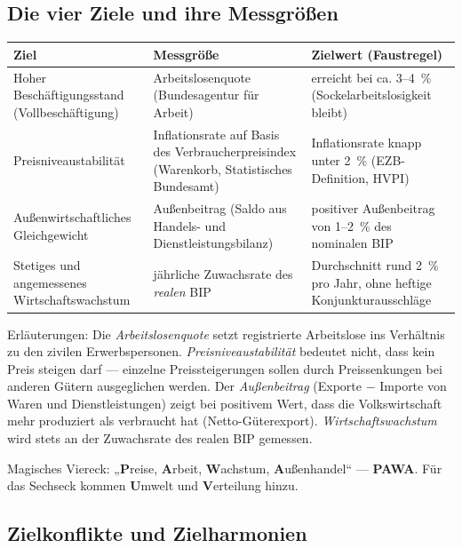 \documentclass[11pt, a4paper]{article}
\begin{document}
\subsection{Die vier Ziele und ihre Messgrößen}

\begin{center}
\begin{tabular}{p{4.2cm} p{4.6cm} p{5.4cm}}
\toprule
\textbf{Ziel} & \textbf{Messgröße} & \textbf{Zielwert (Faustregel)}\\
\midrule
Hoher Beschäftigungsstand (Vollbeschäftigung) & Arbeitslosenquote (Bundesagentur für Arbeit) & erreicht bei ca. 3--4~\% (Sockelarbeitslosigkeit bleibt)\\
Preisniveaustabilität & Inflationsrate auf Basis des Verbraucherpreisindex (Warenkorb, Statistisches Bundesamt) & Inflationsrate knapp unter 2~\% (EZB-Definition, HVPI)\\
Außenwirtschaftliches Gleichgewicht & Außenbeitrag (Saldo aus Handels- und Dienstleistungsbilanz) & positiver Außenbeitrag von 1--2~\% des nominalen BIP\\
Stetiges und angemessenes Wirtschaftswachstum & jährliche Zuwachsrate des \emph{realen} BIP & Durchschnitt rund 2~\% pro Jahr, ohne heftige Konjunkturausschläge\\
\bottomrule
\end{tabular}
\end{center}

Erläuterungen: Die \emph{Arbeitslosenquote} setzt registrierte Arbeitslose ins Verhältnis
zu den zivilen Erwerbspersonen. \emph{Preisniveaustabilität} bedeutet nicht, dass kein
Preis steigen darf --- einzelne Preissteigerungen sollen durch Preissenkungen bei anderen
Gütern ausgeglichen werden. Der \emph{Außenbeitrag} (Exporte $-$ Importe von Waren und
Dienstleistungen) zeigt bei positivem Wert, dass die Volkswirtschaft mehr produziert als
verbraucht hat (Netto-Güterexport). \emph{Wirtschaftswachstum} wird stets an der
Zuwachsrate des realen BIP gemessen.

\begin{eselsbruecke}
Magisches Viereck: „\textbf{P}reise, \textbf{A}rbeit, \textbf{W}achstum,
\textbf{A}ußenhandel`` --- \textbf{PAWA}. Für das Sechseck kommen \textbf{U}mwelt und
\textbf{V}erteilung hinzu.
\end{eselsbruecke}

\subsection{Zielkonflikte und Zielharmonien}
\end{document}
